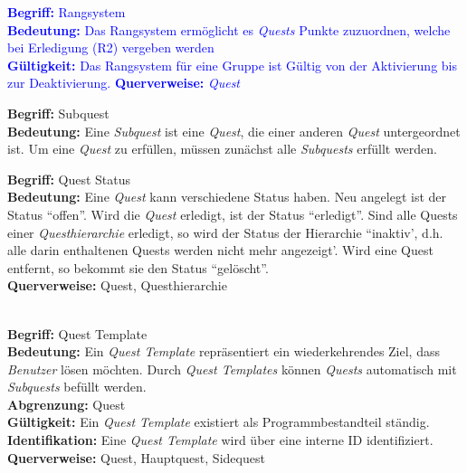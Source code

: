 \documentclass{article}
\begin{document}
\textcolor{blue}
{
\begin{samepage}
\textbf{Begriff:} Rangsystem\\
\textbf{Bedeutung:} Das Rangsystem ermöglicht es \textit{Quests} Punkte zuzuordnen, welche bei Erledigung (R2) vergeben werden\\ 
\textbf{Gültigkeit:} Das Rangsystem für eine Gruppe ist Gültig von der Aktivierung bis zur Deaktivierung.
\textbf{Querverweise:} \textit{Quest}\\
\end{samepage}
}

\begin{samepage}
\textbf{Begriff:} Subquest \\
\textbf{Bedeutung:} Eine \textit{Subquest} ist eine \textit{Quest}, die einer anderen \textit{Quest} untergeordnet ist. Um eine \textit{Quest} zu erfüllen, müssen zunächst alle \textit{Subquests} erfüllt werden. \\
\end{samepage}

\begin{samepage}
\textbf{Begriff:} Quest Status \\
\textbf{Bedeutung:} Eine \textit{Quest} kann verschiedene Status haben. Neu angelegt ist der Status ``offen''. Wird die \textit{Quest} erledigt, ist der Status ``erledigt''. Sind alle Quests einer \textit{Questhierarchie} erledigt, so wird der Status der Hierarchie ``inaktiv', d.h. alle darin enthaltenen Quests werden nicht mehr angezeigt'. Wird eine Quest entfernt, so bekommt sie den Status ``gelöscht''.\\
\textbf{Querverweise:} Quest,  Questhierarchie \\ \\
\end{samepage}

\begin{samepage}
\textbf{Begriff:} Quest Template \\
\textbf{Bedeutung:} Ein \textit{Quest Template} repräsentiert ein wiederkehrendes Ziel, dass \textit{Benutzer} lösen möchten. Durch \textit{Quest Templates} können \textit{Quests} automatisch mit \textit{Subquests} befüllt werden. \\
\textbf{Abgrenzung:} Quest \\
\textbf{Gültigkeit:} Ein \textit{Quest Template} existiert als Programmbestandteil ständig. \\
\textbf{Identifikation:} Eine \textit{Quest Template} wird über eine interne ID identifiziert. \\
\textbf{Querverweise:} Quest, Hauptquest, Sidequest \\ \\
\end{samepage}
\end{document}
